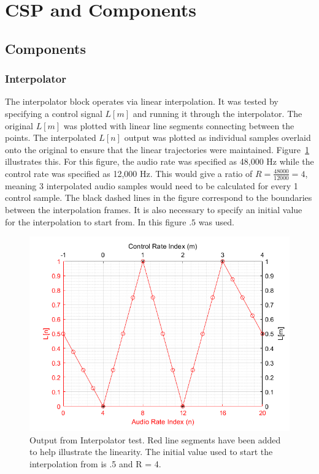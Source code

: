 \documentclass[../main.tex]{subfiles}
\begin{document}
\clearpage

\section{CSP and Components}
\subsection{Components}
\subsubsection{Interpolator}
The interpolator block operates via linear interpolation. It was tested by specifying a control signal $L[m]$ and running it through the interpolator. The original $L[m]$ was plotted with linear line segments connecting between the points. The interpolated $L[n]$ output was plotted as individual samples overlaid onto the original to ensure that the linear trajectories were maintained. Figure~\ref{fig:InterpTest} illustrates this. For this figure, the audio rate was specified as 48,000 Hz while the control rate was specified as 12,000 Hz. This would give a ratio of $R = \frac{48000}{12000} = 4$, meaning 3 interpolated audio samples would need to be calculated for every 1 control sample. The black dashed lines in the figure correspond to the boundaries between the interpolation frames. It is also necessary to specify an initial value for the interpolation to start from. In this figure $.5$ was used.

\begin{figure}[h]
    \centering
    \includegraphics[scale=.65]{./images/plots/InterpolatorTest.png}
    \caption{Output from Interpolator test. Red line segments have been added to help illustrate the linearity. The initial value used to start the interpolation from is .5 and R = 4.}
    \label{fig:InterpTest}
\end{figure}
\end{document}
